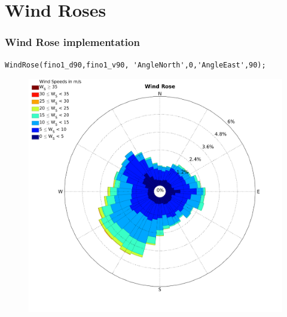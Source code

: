\documentclass[12pt,t]{beamer}
\begin{document}
\section{Wind Roses}
\begin{frame}[fragile]
\frametitle{Wind Rose implementation}
\begin{lstlisting}
WindRose(fino1_d90,fino1_v90, 'AngleNorth',0,'AngleEast',90);
\end{lstlisting}
\begin{figure}
\centering
\includegraphics[width=0.45\linewidth]{../../figures/WindRose_Fino1.png}
\end{figure}

\end{frame}
\end{document}
